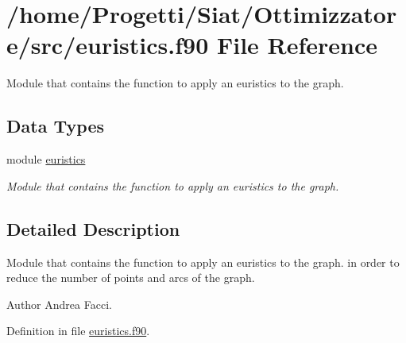 \hypertarget{euristics_8f90}{\section{/home/\-Progetti/\-Siat/\-Ottimizzatore/src/euristics.f90 File Reference}
\label{euristics_8f90}
}


Module that contains the function to apply an euristics to the graph.  


\subsection*{Data Types}
\begin{DoxyCompactItemize}
\item 
module \hyperlink{classeuristics}{euristics}
\begin{DoxyCompactList}\small\item\em Module that contains the function to apply an euristics to the graph. \end{DoxyCompactList}\end{DoxyCompactItemize}


\subsection{Detailed Description}
Module that contains the function to apply an euristics to the graph. in order to reduce the number of points and arcs of the graph. \begin{DoxyAuthor}{Author}
Andrea Facci. 
\end{DoxyAuthor}


Definition in file \hyperlink{euristics_8f90_source}{euristics.\-f90}.

